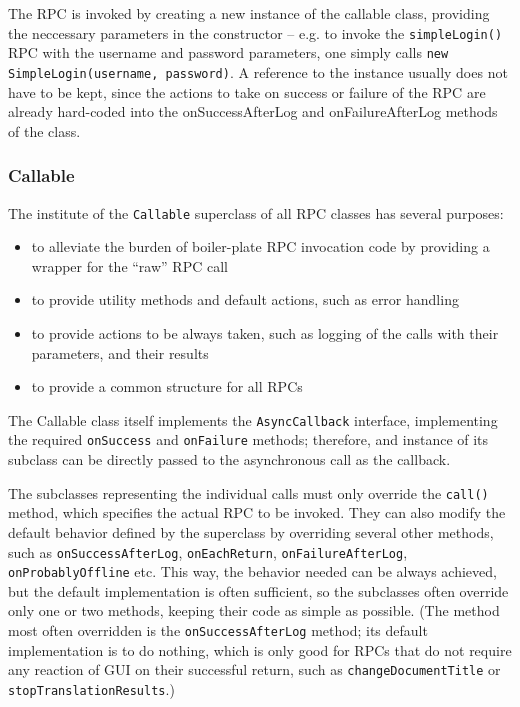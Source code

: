 The RPC is invoked by creating a new instance of the callable class, providing the neccessary parameters in the constructor -- e.g. to invoke the {\tt simpleLogin()} RPC with the username and password parameters, one simply calls {\tt new SimpleLogin(username, password)}. A reference to the instance usually does not have to be kept, since the actions to take on success or failure of the RPC are already hard-coded into the onSuccessAfterLog and onFailureAfterLog methods of the class.

\subsubsection{Callable}

The institute of the {\tt Callable} superclass of all RPC classes has several purposes:

\begin{itemize}
\item to alleviate the burden of boiler-plate RPC invocation code by providing a wrapper for the ``raw'' RPC call
\item to provide utility methods and default actions, such as error handling
\item to provide actions to be always taken, such as logging of the calls with their parameters, and their results
\item to provide a common structure for all RPCs
\end{itemize}

The Callable class itself implements the {\tt AsyncCallback} interface, implementing the required {\tt onSuccess} and {\tt onFailure} methods; therefore, and instance of its subclass can be directly passed to the asynchronous call as the callback.

The subclasses representing the individual calls must only override the {\tt call()} method, which specifies the actual RPC to be invoked.
They can also modify the default behavior defined by the superclass by overriding several other methods, such as {\tt onSuccessAfterLog}, {\tt onEachReturn}, {\tt onFailureAfterLog}, {\tt onProbablyOffline} etc. This way, the behavior needed can be always achieved, but the default implementation is often sufficient, so the subclasses often override only one or two methods, keeping their code as simple as possible. (The method most often overridden is the {\tt onSuccessAfterLog} method; its default implementation is to do nothing, which is only good for RPCs that do not require any reaction of GUI on their successful return, such as {\tt changeDocumentTitle} or {\tt stopTranslationResults}.)

